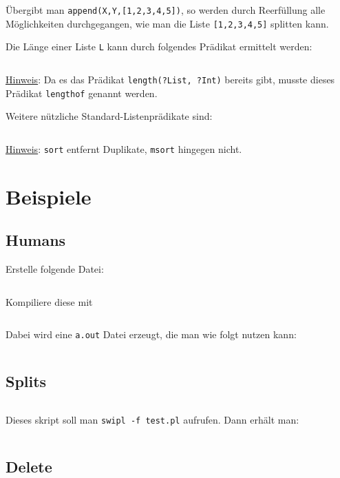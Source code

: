 Übergibt man \texttt{append(X,Y,[1,2,3,4,5])}, so werden durch Reerfüllung alle
Möglichkeiten durchgegangen, wie man die Liste \texttt{[1,2,3,4,5]} splitten kann.

Die Länge einer Liste \texttt{L} kann durch folgendes Prädikat ermittelt werden:%

\inputminted[numbersep=5pt, tabsize=4]{prolog}{scripts/prolog/list-length.pl}

\underline{Hinweis}: Da es das Prädikat \texttt{length(?List, ?Int)} bereits gibt, 
musste dieses Prädikat \texttt{lengthof} genannt werden.

Weitere nützliche Standard-Listenprädikate sind:
\inputminted[numbersep=5pt, tabsize=4]{prolog}{scripts/prolog/standard-list-predicates.pl}

\underline{Hinweis}: \texttt{sort} entfernt Duplikate, \texttt{msort} hingegen nicht.

\section{Beispiele}
\subsection{Humans}
Erstelle folgende Datei:
\inputminted[linenos, numbersep=5pt, tabsize=4, frame=lines, label=human.pro]{prolog}{scripts/prolog/human.pro}

Kompiliere diese mit
\inputminted[numbersep=5pt, tabsize=4]{bash}{scripts/prolog/human.sh}

Dabei wird eine \texttt{a.out} Datei erzeugt, die man wie folgt
nutzen kann:
\inputminted[numbersep=5pt, tabsize=4]{bash}{scripts/prolog/human-2.sh}

\subsection{Splits}
\inputminted[linenos, numbersep=5pt, tabsize=4, frame=lines, label=splits.pl]{prolog}{scripts/prolog/splits.pl}

Dieses skript soll man \texttt{swipl -f test.pl} aufrufen. Dann erhält man:

\inputminted[numbersep=5pt, tabsize=4]{prolog}{scripts/prolog/splits.sh}

\subsection{Delete}%
\inputminted[numbersep=5pt, tabsize=4]{prolog}{scripts/prolog/delete.pl}

